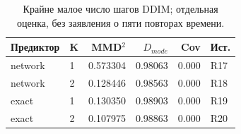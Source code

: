 \begin{table}[H]\centering\small
\setlength{\tabcolsep}{4pt}
\caption{Крайне малое число шагов DDIM; отдельная оценка, без заявления о пяти повторах времени.}\label{tab:low}
\begin{tabular}{llrrrl}
\toprule
Предиктор & K & MMD$^2$ & $D_{mode}$ & Cov & Ист. \\
\midrule
network & 1 & 0.573304 & 0.98063 & 0.000 & R17 \\
network & 2 & 0.128446 & 0.98563 & 0.000 & R18 \\
exact & 1 & 0.130350 & 0.98903 & 0.000 & R19 \\
exact & 2 & 0.107975 & 0.98863 & 0.000 & R20 \\
\bottomrule
\end{tabular}
\end{table}
